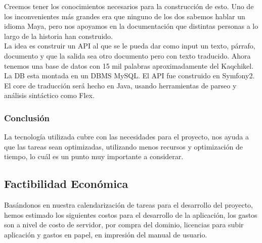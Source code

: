 \documentclass[a4paper,openright,12pt]{article}
\begin{document}
Creemos tener los conocimientos necesarios para la construcci\'on de esto. Uno de los inconvenientes m\'as grandes era que ninguno de los dos sabemos hablar un idioma Maya, pero nos apoyamos en la documentaci\'on que distintas personas a lo largo de la historia han construido.\\ 

La idea es construir un API al que se le pueda dar como input un texto, p\'arrafo, documento y que la salida sea otro documento pero con texto traducido. Ahora tenemos una base de datos con 15 mil palabras aproximadamente del Kaqchikel. La DB esta montada en un DBMS MySQL. El API fue construido en Symfony2.\\

El core de traducci\'on ser\'a hecho en Java,  usando herramientas de parseo y an\'alisis sint\'actico como Flex.

\subsubsection{Conclusión}
La tecnología utilizada cubre con las necesidades para el proyecto, nos ayuda a que las tareas sean optimizadas, utilizando menos recursos y optimización de tiempo, lo cuál es un punto muy importante a considerar.

\subsection{Factibilidad Econ\'omica}
Bas\'andonos en nuestra calendarizaci\'on de tareas para el desarrollo del proyecto, hemos estimado los siguientes costos para el desarrollo de la aplicaci\'on, los gastos son a nivel de costo de servidor, por compra del dominio, licencias para subir aplicaci\'on y gastos en papel, en impresi\'on del manual de usuario.\\

\begin{table}[h]
\caption{Factibilidad Econ\'omica}
\end{table}
\end{document}

